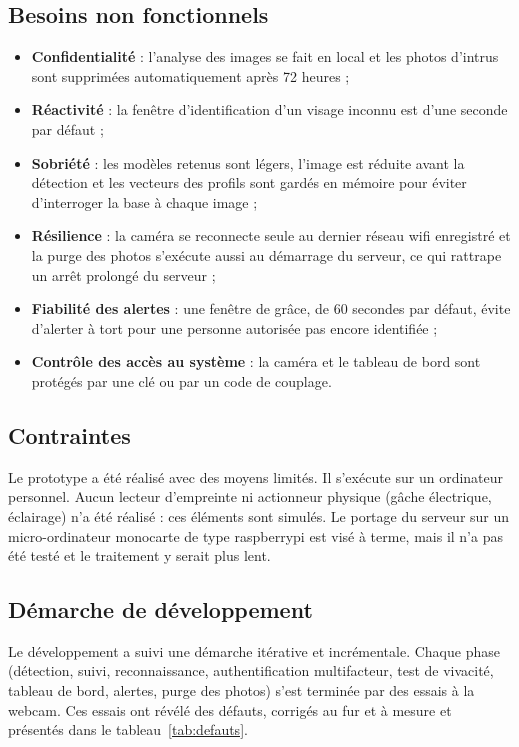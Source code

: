 \subsection{Besoins non fonctionnels}

\begin{itemize}
  \item \textbf{Confidentialité} : l'analyse des images se fait en local et les photos d'intrus sont supprimées automatiquement après 72 heures ;
  \item \textbf{Réactivité} : la fenêtre d'identification d'un visage inconnu est d'une seconde par défaut ;
  \item \textbf{Sobriété} : les modèles retenus sont légers, l'image est réduite avant la détection et les vecteurs des profils sont gardés en mémoire pour éviter d'interroger la base à chaque image ;
  \item \textbf{Résilience} : la caméra se reconnecte seule au dernier réseau \gls{wifi} enregistré et la purge des photos s'exécute aussi au démarrage du serveur, ce qui rattrape un arrêt prolongé du serveur ;
  \item \textbf{Fiabilité des alertes} : une fenêtre de grâce, de 60 secondes par défaut, évite d'alerter à tort pour une personne autorisée pas encore identifiée ;
  \item \textbf{Contrôle des accès au système} : la caméra et le tableau de bord sont protégés par une clé ou par un code de couplage.
\end{itemize}

\subsection{Contraintes}

Le prototype a été réalisé avec des moyens limités. Il s'exécute sur un ordinateur personnel. Aucun lecteur d'empreinte ni actionneur physique (gâche électrique, éclairage) n'a été réalisé : ces éléments sont simulés. Le portage du serveur sur un micro-ordinateur monocarte de type \gls{raspberrypi} est visé à terme, mais il n'a pas été testé et le traitement y serait plus lent.

\subsection{Démarche de développement}

\begin{maj}
Le développement a suivi une démarche itérative et incrémentale. Chaque phase (détection, suivi, reconnaissance, authentification multifacteur, test de vivacité, tableau de bord, alertes, purge des photos) s'est terminée par des essais à la webcam. Ces essais ont révélé des défauts, corrigés au fur et à mesure et présentés dans le tableau~\ref{tab:defauts}.
\end{maj}

